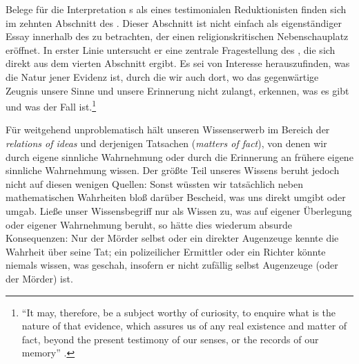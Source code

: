 Belege für die Interpretation s als eines testimonialen
Reduktionisten finden sich im zehnten Abschnitt des .
Dieser Abschnitt  ist nicht einfach als eigenständiger Essay
innerhalb des  zu betrachten, der einen religionskritischen
Nebenschauplatz eröffnet. In erster Linie untersucht er eine zentrale
Fragestellung des , die sich direkt aus dem vierten Abschnitt
 ergibt.
Es sei von Interesse herauszufinden, was die Natur jener Evidenz ist, durch die
wir auch dort, wo das gegenwärtige Zeugnis unsere Sinne und unsere Erinnerung
nicht zulangt, erkennen, was es gibt und was der Fall ist.\footnote{\enquote{It
may, therefore, be a subject worthy of curiosity, to enquire what is the nature
of that evidence, which assures us of any real existence and matter of fact,
beyond the present testimony of our senses, or the records of our memory}
\parencite[][23]{Hume:AnEnquiryConcerningHumanUnderstanding1964}.}


Für weitgehend unproblematisch hält  unseren Wissenserwerb im Bereich
der \emph{relations of ideas} und derjenigen Tatsachen (\emph{matters of
fact}), von denen wir durch eigene sinnliche Wahrnehmung oder durch die
Erinnerung an frühere eigene sinnliche Wahrnehmung wissen. Der
größte Teil unseres Wissens beruht jedoch nicht auf diesen wenigen Quellen:
Sonst wüssten wir tatsächlich neben mathematischen Wahrheiten bloß darüber
Bescheid, was uns direkt umgibt oder umgab. Ließe unser Wissensbegriff nur als Wissen
zu, was auf eigener Überlegung oder eigener Wahrnehmung beruht, so hätte dies
wiederum absurde Konsequenzen: Nur der Mörder selbst oder ein direkter
Augenzeuge kennte die Wahrheit über seine Tat; ein polizeilicher Ermittler oder
ein Richter könnte niemals wissen, was geschah, insofern er nicht zufällig
selbst Augenzeuge (oder der Mörder) ist.

